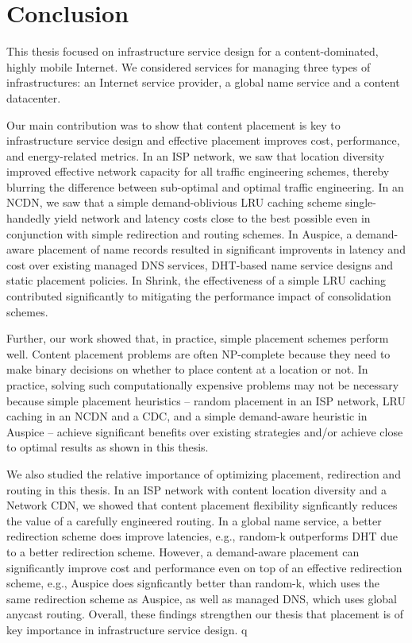\chapter{Conclusion}

This thesis focused on infrastructure service design for  a content-dominated, highly mobile Internet. We considered services for managing three types of infrastructures: an Internet service provider, a global name service and a content datacenter.

Our main contribution was to show that content placement is key to infrastructure service design and effective placement improves cost, performance, and energy-related metrics. In an ISP network, we saw that location diversity improved effective network capacity for all traffic engineering schemes, thereby blurring the difference between sub-optimal and optimal traffic engineering. In an NCDN, we saw that a simple demand-oblivious LRU caching scheme single-handedly yield network and latency costs close to the best possible even in conjunction with simple redirection and routing schemes. In Auspice, a demand-aware placement of name records resulted in significant improvents in latency and cost over existing managed DNS services, DHT-based name service designs and static placement policies. In Shrink, the effectiveness of a simple LRU caching contributed significantly to mitigating the performance impact of consolidation schemes.

Further, our work showed that, in practice, simple placement schemes perform well. Content placement problems are often NP-complete because they need to make binary decisions on whether to place content at a location or not. In practice, solving such computationally expensive problems may not be necessary because simple placement heuristics -- random placement in an ISP network, LRU caching in an NCDN and a CDC, and a simple demand-aware heuristic in Auspice -- achieve significant benefits over existing strategies and/or achieve close to optimal results as shown in this thesis.

We also studied the relative importance of optimizing placement, redirection and routing in this thesis. In an ISP network with content location diversity and a Network CDN, we showed that content placement flexibility signficantly reduces the value of a carefully engineered routing. In a global name service, a better redirection scheme does improve latencies, e.g., random-k outperforms DHT due to a better redirection scheme. However, a demand-aware placement can significantly improve cost and performance even on top of an effective redirection scheme, e.g.,  Auspice does signficantly better than random-k, which uses the same redirection scheme as Auspice, as well as managed DNS, which uses global anycast routing. Overall, these findings strengthen our thesis that placement is of key importance in infrastructure service design.
q